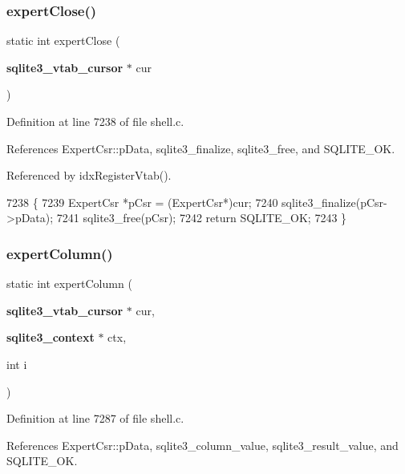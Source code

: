 \subsubsection{expert\+Close()}
{\footnotesize\ttfamily static int expert\+Close (\begin{DoxyParamCaption}\item[{\textbf{ sqlite3\+\_\+vtab\+\_\+cursor} $\ast$}]{cur }\end{DoxyParamCaption})\hspace{0.3cm}{\ttfamily [static]}}



Definition at line 7238 of file shell.\+c.



References Expert\+Csr\+::p\+Data, sqlite3\+\_\+finalize, sqlite3\+\_\+free, and S\+Q\+L\+I\+T\+E\+\_\+\+OK.



Referenced by idx\+Register\+Vtab().


\begin{DoxyCode}
7238                                                 \{
7239   ExpertCsr *pCsr = (ExpertCsr*)cur;
7240   sqlite3_finalize(pCsr->pData);
7241   sqlite3_free(pCsr);
7242   \textcolor{keywordflow}{return} SQLITE_OK;
7243 \}
\end{DoxyCode}
\mbox{\label{shell_8c_abd3c045fcd806e0d9372eb8a0322227a}} 
\subsubsection{expert\+Column()}
{\footnotesize\ttfamily static int expert\+Column (\begin{DoxyParamCaption}\item[{\textbf{ sqlite3\+\_\+vtab\+\_\+cursor} $\ast$}]{cur,  }\item[{\textbf{ sqlite3\+\_\+context} $\ast$}]{ctx,  }\item[{int}]{i }\end{DoxyParamCaption})\hspace{0.3cm}{\ttfamily [static]}}



Definition at line 7287 of file shell.\+c.



References Expert\+Csr\+::p\+Data, sqlite3\+\_\+column\+\_\+value, sqlite3\+\_\+result\+\_\+value, and S\+Q\+L\+I\+T\+E\+\_\+\+OK.



